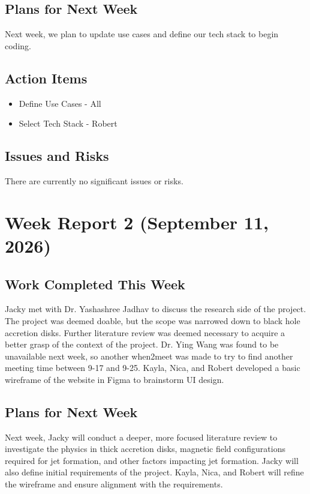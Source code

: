 \subsection{Plans for Next Week}
Next week, we plan to update use cases and define our tech stack to begin coding.

\subsection{Action Items}
\begin{itemize}
    \item Define Use Cases - All
    \item Select Tech Stack - Robert
\end{itemize}

\subsection{Issues and Risks}
There are currently no significant issues or risks.

\section{Week Report 2 (September 11, 2026)}
\subsection{Work Completed This Week}
Jacky met with Dr. Yashashree Jadhav to discuss the research side of the project. The project was deemed doable, but the scope was narrowed down to black hole accretion disks. Further literature review was deemed necessary to acquire a better grasp of the context of the project. Dr. Ying Wang was found to be unavailable next week, so another when2meet was made to try to find another meeting time between 9-17 and 9-25. Kayla, Nica, and Robert developed a basic wireframe of the website in Figma to brainstorm UI design.

\subsection{Plans for Next Week}
Next week, Jacky will conduct a deeper, more focused literature review to investigate the physics in thick accretion disks, magnetic field configurations required for jet formation, and other factors impacting jet formation. Jacky will also define initial requirements of the project. Kayla, Nica, and Robert will refine the wireframe and ensure alignment with the requirements.

